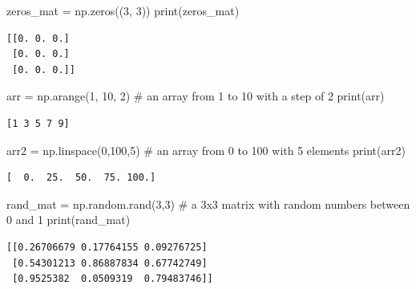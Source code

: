 \documentclass[
  letterpaper,
  DIV=11,
  numbers=noendperiod]{scrreprt}
\newenvironment{Shaded}{\begin{snugshade}}{\end{snugshade}}
\newcommand{\BuiltInTok}[1]{\textcolor[rgb]{0.00,0.23,0.31}{#1}}
\newcommand{\CommentTok}[1]{\textcolor[rgb]{0.37,0.37,0.37}{#1}}
\newcommand{\DecValTok}[1]{\textcolor[rgb]{0.68,0.00,0.00}{#1}}
\newcommand{\NormalTok}[1]{\textcolor[rgb]{0.00,0.23,0.31}{#1}}
\newcommand{\OperatorTok}[1]{\textcolor[rgb]{0.37,0.37,0.37}{#1}}
\begin{document}
\begin{Shaded}
\begin{Highlighting}[]
\NormalTok{zeros\_mat }\OperatorTok{=}\NormalTok{ np.zeros((}\DecValTok{3}\NormalTok{, }\DecValTok{3}\NormalTok{))}
\BuiltInTok{print}\NormalTok{(zeros\_mat)}
\end{Highlighting}
\end{Shaded}

\begin{verbatim}
[[0. 0. 0.]
 [0. 0. 0.]
 [0. 0. 0.]]
\end{verbatim}

\begin{Shaded}
\begin{Highlighting}[]
\NormalTok{arr }\OperatorTok{=}\NormalTok{ np.arange(}\DecValTok{1}\NormalTok{, }\DecValTok{10}\NormalTok{, }\DecValTok{2}\NormalTok{) }\CommentTok{\# an array from 1 to 10 with a step of 2}
\BuiltInTok{print}\NormalTok{(arr)}
\end{Highlighting}
\end{Shaded}

\begin{verbatim}
[1 3 5 7 9]
\end{verbatim}

\begin{Shaded}
\begin{Highlighting}[]
\NormalTok{arr2 }\OperatorTok{=}\NormalTok{ np.linspace(}\DecValTok{0}\NormalTok{,}\DecValTok{100}\NormalTok{,}\DecValTok{5}\NormalTok{) }\CommentTok{\# an array from 0 to 100 with 5 elements}
\BuiltInTok{print}\NormalTok{(arr2)}
\end{Highlighting}
\end{Shaded}

\begin{verbatim}
[  0.  25.  50.  75. 100.]
\end{verbatim}

\begin{Shaded}
\begin{Highlighting}[]
\NormalTok{rand\_mat }\OperatorTok{=}\NormalTok{ np.random.rand(}\DecValTok{3}\NormalTok{,}\DecValTok{3}\NormalTok{) }\CommentTok{\# a 3x3 matrix with random numbers between 0 and 1}
\BuiltInTok{print}\NormalTok{(rand\_mat)}
\end{Highlighting}
\end{Shaded}

\begin{verbatim}
[[0.26706679 0.17764155 0.09276725]
 [0.54301213 0.86887834 0.67742749]
 [0.9525382  0.0509319  0.79483746]]
\end{verbatim}
\end{document}
